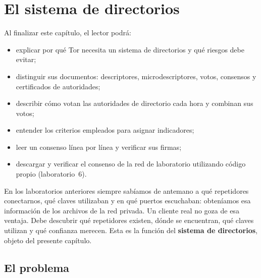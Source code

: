 \chapter{El sistema de directorios}\label{cap:12-directory}

\begin{obiettivi}
Al finalizar este capítulo, el lector podrá:
\begin{itemize}[nosep]
  \item explicar por qué Tor necesita un sistema de directorios y qué riesgos debe evitar;
  \item distinguir sus documentos: descriptores, microdescriptores, votos, consensos y certificados de autoridades;
  \item describir cómo votan las autoridades de directorio cada hora y combinan sus votos;
  \item entender los criterios empleados para asignar indicadores;
  \item leer un consenso línea por línea y verificar sus firmas;
  \item descargar y verificar el consenso de la red de laboratorio utilizando código propio (laboratorio~6).
\end{itemize}
\end{obiettivi}

En los laboratorios anteriores siempre sabíamos de antemano a qué repetidores conectarnos, qué claves utilizaban y en qué puertos escuchaban: obteníamos esa información de los archivos de la red privada. Un cliente real no goza de esa ventaja. Debe descubrir qué repetidores existen, dónde se encuentran, qué claves utilizan y qué confianza merecen. Esta es la función del \textbf{sistema de directorios}, objeto del presente capítulo.

\section{El problema}\label{sec:dir-problema}

